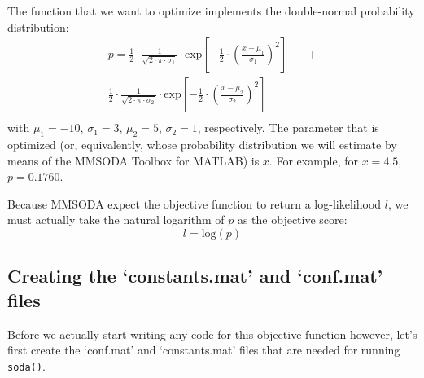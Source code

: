 

The function that we want to optimize implements the double-normal probability distribution:
\begin{equation}\label{eq:double-normal}
\begin{align}
p=\frac{1}{2}\cdot{}\frac{1}{\sqrt{2\cdot{}\pi\cdot{}\sigma{}_1}}\cdot{}\mathrm{exp}\left[-\frac{1}{2}\cdot{}\left(\frac{x-\mu_1}{\sigma_1} \right)^2 \right] \quad & + \\
\frac{1}{2}\cdot{}\frac{1}{\sqrt{2\cdot{}\pi\cdot{}\sigma{}_2}}\cdot{}\mathrm{exp}\left[-\frac{1}{2}\cdot{}\left(\frac{x-\mu_2}{\sigma_2} \right)^2 \right] \quad & \\
\end{align}
\end{equation}
with $\mu_1 = -10$, $\sigma_1 = 3$, $\mu_2 = 5$, $\sigma_2 = 1$, respectively. The parameter that is optimized (or, equivalently, whose probability distribution we will estimate by means of the MMSODA Toolbox for MATLAB) is $x$. For example, for $x=4.5$, $p = 0.1760$.

Because MMSODA expect the objective function to return a log-likelihood $l$, we must actually take the natural logarithm of $p$ as the objective score:
\begin{equation}\label{eq:log-likelihood}
l=\mathrm{log}\left(p\right)
\end{equation}

\subsection{Creating the `constants.mat' and `conf.mat' files}

Before we actually start writing any code for this objective function however, let's first create the `conf.mat' and `constants.mat' files that are needed for running \texttt{soda()}.


